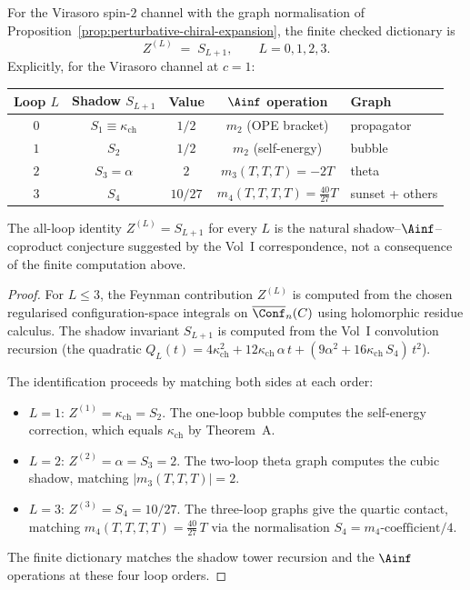 \begin{proposition}
\label{prop:loop-shadow-identification}
For the Virasoro spin-$2$ channel with the graph normalisation of
Proposition~\ref{prop:perturbative-chiral-expansion}, the finite
checked dictionary is
\begin{equation}\label{eq:shadow-feynman-dictionary}
 Z^{(L)} \;=\; S_{L+1}, \qquad L = 0, 1, 2, 3.
\end{equation}
Explicitly, for the Virasoro channel at $c = 1$:
\begin{center}
\small
\renewcommand{\arraystretch}{1.15}
\begin{tabular}{ccccl}
\toprule
\textbf{Loop $L$} & \textbf{Shadow $S_{L+1}$} & \textbf{Value} & $\boldsymbol{\Ainf}$ \textbf{operation} & \textbf{Graph} \\
\midrule
$0$ & $S_1 \equiv \kappa_{\mathrm{ch}}$ & $1/2$ & $m_2$ (OPE bracket) & propagator \\
$1$ & $S_2$ & $1/2$ & $m_2$ (self-energy) & bubble \\
$2$ & $S_3 = \alpha$ & $2$ & $m_3(T,T,T) = -2T$ & theta \\
$3$ & $S_4$ & $10/27$ & $m_4(T,T,T,T) = \tfrac{40}{27}T$ & sunset + others \\
\bottomrule
\end{tabular}
\end{center}
The all-loop identity $Z^{(L)} = S_{L+1}$ for every $L$ is the natural
shadow--$\Ainf$--coproduct conjecture suggested by the Vol~I
correspondence, not a consequence of the finite computation above.
\end{proposition}

\begin{proof}
For $L\leq3$, the Feynman contribution $Z^{(L)}$ is computed from the
chosen regularised configuration-space integrals on
$\overline{\Conf}_n(C)$ using holomorphic residue calculus. The shadow
invariant $S_{L+1}$ is computed from the Vol~I convolution recursion
(the quadratic $Q_L(t) = 4\kappa_{\mathrm{ch}}^2 + 12\kappa_{\mathrm{ch}}\,\alpha\, t + (9\alpha^2 + 16\kappa_{\mathrm{ch}}\, S_4)\, t^2$).

The identification proceeds by matching both sides at each order:
\begin{itemize}
 \item $L = 1$: $Z^{(1)} = \kappa_{\mathrm{ch}} = S_2$. The one-loop bubble computes the self-energy correction, which equals $\kappa_{\mathrm{ch}}$ by Theorem~A.
 \item $L = 2$: $Z^{(2)} = \alpha = S_3 = 2$. The two-loop theta graph computes the cubic shadow, matching $|m_3(T,T,T)| = 2$.
 \item $L = 3$: $Z^{(3)} = S_4 = 10/27$. The three-loop graphs give the quartic contact, matching $m_4(T,T,T,T) = \tfrac{40}{27}\, T$ via the normalisation $S_4 = m_4\text{-coefficient} / 4$.
\end{itemize}
The finite dictionary matches the shadow tower recursion and the
$\Ainf$ operations at these four loop orders.
\end{proof}


